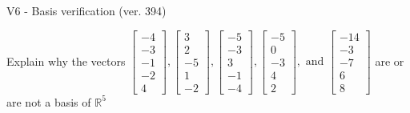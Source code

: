 \begin{exercise}
  \begin{exerciseTitle}V6 - Basis verification (ver. 394)\end{exerciseTitle}
  \begin{exerciseStatement}
    Explain why the vectors \(\left[\begin{array}{r}
-4 \\
-3 \\
-1 \\
-2 \\
4
\end{array}\right] , \left[\begin{array}{r}
3 \\
2 \\
-5 \\
1 \\
-2
\end{array}\right] , \left[\begin{array}{r}
-5 \\
-3 \\
3 \\
-1 \\
-4
\end{array}\right] , \left[\begin{array}{r}
-5 \\
0 \\
-3 \\
4 \\
2
\end{array}\right] , \text{ and } \left[\begin{array}{r}
-14 \\
-3 \\
-7 \\
6 \\
8
\end{array}\right]\) are or are not a basis of \(\mathbb{R}^5\)	



\end{exerciseStatement}
\end{exercise}
